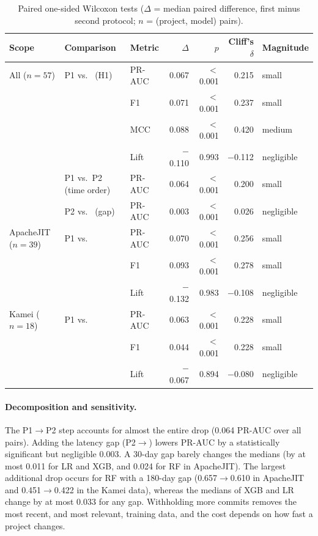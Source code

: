 \begin{table}[t]
\centering
\caption{Paired one-sided Wilcoxon tests ($\Delta$ = median paired difference, first minus second protocol; $n$ = (project, model) pairs).}
\label{tab:rq1tests}
\small
\begin{tabular}{lllrrrl}
\toprule
Scope & Comparison & Metric & $\Delta$ & $p$ & Cliff's $\delta$ & Magnitude \\
\midrule
All ($n=57$) & P1 vs.\ \pthree{} (H1) & PR-AUC & 0.067 & $<$0.001 & 0.215 & small \\
             &                        & F1     & 0.071 & $<$0.001 & 0.237 & small \\
             &                        & MCC    & 0.088 & $<$0.001 & 0.420 & medium \\
             &                        & Lift   & $-$0.110 & 0.993 & $-$0.112 & negligible \\
             & P1 vs.\ P2 (time order) & PR-AUC & 0.064 & $<$0.001 & 0.200 & small \\
             & P2 vs.\ \pthree{} (gap)  & PR-AUC & 0.003 & $<$0.001 & 0.026 & negligible \\
\midrule
ApacheJIT ($n=39$) & P1 vs.\ \pthree{} & PR-AUC & 0.070 & $<$0.001 & 0.256 & small \\
                   &                   & F1     & 0.093 & $<$0.001 & 0.278 & small \\
                   &                   & Lift   & $-$0.132 & 0.983 & $-$0.108 & negligible \\
\midrule
Kamei ($n=18$) & P1 vs.\ \pthree{} & PR-AUC & 0.063 & $<$0.001 & 0.228 & small \\
               &                   & F1     & 0.044 & $<$0.001 & 0.228 & small \\
               &                   & Lift   & $-$0.067 & 0.894 & $-$0.080 & negligible \\
\bottomrule
\end{tabular}
\end{table}

\paragraph{Decomposition and sensitivity.} The P1$\to$P2 step accounts for almost the entire drop (0.064 PR-AUC over all pairs). Adding the latency gap (P2$\to$\pthree) lowers PR-AUC by a statistically significant but negligible 0.003. A 30-day gap barely changes the medians (by at most 0.011 for LR and XGB, and 0.024 for RF in ApacheJIT). The largest additional drop occurs for RF with a 180-day gap (0.657$\to$0.610 in ApacheJIT and 0.451$\to$0.422 in the Kamei data), whereas the medians of XGB and LR change by at most 0.033 for any gap. Withholding more commits removes the most recent, and most relevant, training data, and the cost depends on how fast a project changes.

